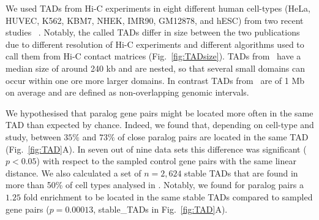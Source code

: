 \documentclass[a4paper,twoside=true,openright,parskip=full,chapterprefix=true,11pt,headings=normal,bibliography=totoc,listof=totoc,titlepage=on,captions=tableabove,draft=false]{scrreprt}
\theoremstyle{definition}
\theoremstyle{definition}
\theoremstyle{definition}
\theoremstyle{remark}
\begin{document}
We used TADs from Hi-C experiments in eight different human cell-types
(HeLa, HUVEC, K562, KBM7, NHEK, IMR90, GM12878, and hESC) from two
recent studies ~\citep{Dixon2012, Rao2014}. Notably, the called TADs
differ in size between the two publications due to different resolution
of Hi-C experiments and different algorithms used to call them from Hi-C
contact matrices (Fig.~\ref{fig:TADsize}). TADs from~\citep{Rao2014}
have a median size of around 240 kb and are nested, so that several
small domains can occur within one ore more larger domains. In contrast
TADs from~\citep{Dixon2012} are of 1 Mb on average and are defined as
non-overlapping genomic intervals.

We hypothesised that paralog gene pairs might be located more often in
the same TAD than expected by chance. Indeed, we found that, depending
on cell-type and study, between \(35\%\) and \(73\%\) of close paralog
pairs are located in the same TAD (Fig.~\ref{fig:TAD}A). In seven out of
nine data sets this difference was significant (\(p<0.05\)) with respect
to the sampled control gene pairs with the same linear distance. We also
calculated a set of \(n=2,624\) stable TADs that are found in more than
50\% of cell types analysed in \citep{Rao2014}. Notably, we found for
paralog pairs a \(1.25\) fold enrichment to be located in the same
stable TADs compared to sampled gene pairs (\(p=0.00013\), stable\_TADs
in Fig.~\ref{fig:TAD}A).
\end{document}
